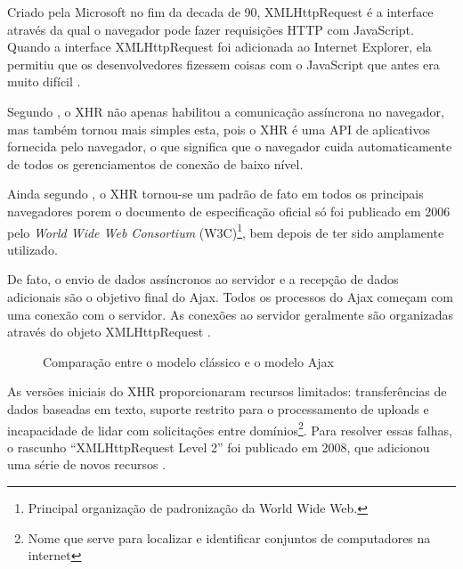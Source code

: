 Criado pela Microsoft no fim da decada de 90, XMLHttpRequest é a interface através da qual o navegador pode fazer requisições HTTP com JavaScript. Quando a interface XMLHttpRequest foi adicionada ao Internet Explorer, ela permitiu que os desenvolvedores fizessem coisas com o JavaScript que antes era muito difícil \cite{haverbeke2014eloquent}.

Segundo , o XHR não apenas habilitou a comunicação assíncrona no navegador, mas também tornou mais simples esta, pois o XHR é uma API de aplicativos fornecida pelo navegador, o que significa que o navegador cuida automaticamente de todos os gerenciamentos de conexão de baixo nível.

Ainda segundo , o XHR tornou-se um padrão de fato em todos os principais navegadores porem o documento de especificação oficial só foi publicado em 2006 pelo \emph{World Wide Web Consortium} (W3C)\footnote{Principal organização de padronização da World Wide Web.}, bem depois de ter sido amplamente utilizado.

De fato, o envio de dados assíncronos ao servidor e a recepção de dados adicionais são o objetivo final do Ajax. Todos os processos do Ajax começam com uma conexão com o servidor. As conexões ao servidor geralmente são organizadas através do objeto XMLHttpRequest \cite{resig2007pro}.

\begin{figure}[!htb]
	\centering
	\caption{Comparação entre o modelo clássico e o modelo Ajax}
	\hfill
	\label{defaultVsAjax}
\end{figure}

\begin{citacao}
	As versões iniciais do XHR proporcionaram recursos limitados: transferências de dados baseadas em texto, suporte restrito para o processamento de uploads e incapacidade de lidar com solicitações entre domínios\footnote{Nome que serve para localizar e identificar conjuntos de computadores na internet}. Para resolver essas falhas, o rascunho “XMLHttpRequest Level 2” foi publicado em 2008, que adicionou uma série de novos recursos \cite[P.~262-263]{grigorik2013high}.
\end{citacao}

